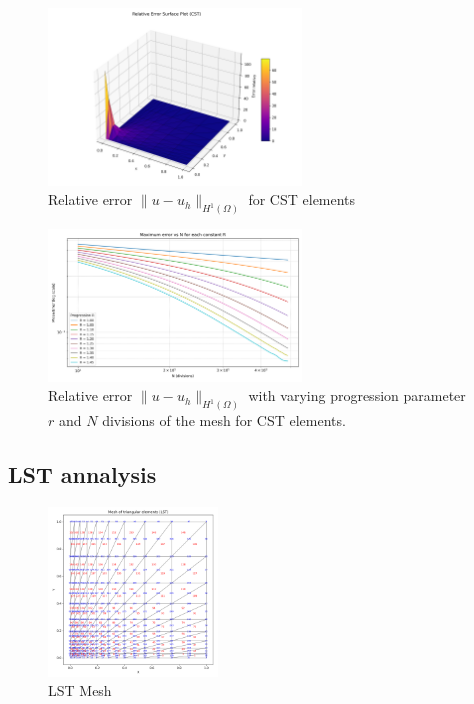 \begin{figure}[H]
\centering
\includegraphics[width=0.6\textwidth]{GRAFICOS/CST/CST_relative_error_surface_plot.png}
\caption{Relative error \(\|u - u_h\|_{H^1(\Omega)}\) for CST elements}
\label{fig:cst_error_vs_h}
\end{figure}

\begin{figure}[H]
\centering
\includegraphics[width=0.6\textwidth]{GRAFICOS/CST/errores_por_R.png}
\caption{Relative error \(\|u - u_h\|_{H^1(\Omega)}\) with varying progression parameter $r$ and $N$ divisions of the mesh for CST elements.}
\label{fig:cst_error_vs_h_loglog}
\end{figure}

\subsection{LST annalysis}

\begin{figure}[H]
\centering
\includegraphics[width=0.4\textwidth]{GRAFICOS/LST/LST_mesh_plot.png}
\caption{LST Mesh}
\label{fig:lst_results}
\end{figure}

